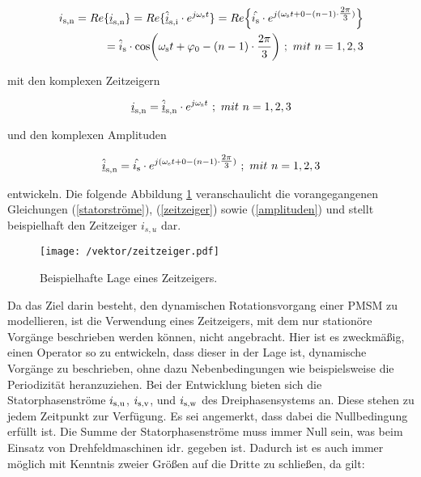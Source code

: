 \begin{align}
	\begin{split}
    i_\i{s,n} = Re\{\underline{i}_\i{s,n}\} = Re\{\underline{\hat i}_\i{s,i}\cdot e^{j\omega_\i{s}t}\} = Re\Bigl\{\hat{i_\i{s}}\cdot e^{j(\omega_\i{s}t+0-(n-1)\cdot\tfrac{2\pi}{3})}\Bigr\}
	\\=\hat{i}_\i{s}\cdot\si{cos}\bigg(\omega_\i{s}t+\varphi_\i{0}-(n-1)\cdot\frac{2\pi}{3}\bigg)~;~mit~n=1,2,3 \label{statorströme} 
\end{split}
\end{align}

mit den komplexen Zeitzeigern

\begin{align}
	\underline{i}_\i{s,n} = \underline{\hat i}_\i{s,n}\cdot e^{j\omega_\i{s}t}~;~mit~n=1,2,3 \label{zeitzeiger}
\end{align}

und den komplexen Amplituden

\begin{align}
	\underline{\hat i}_\i{s,n} = \hat{i_\i{s}}\cdot e^{j(\omega_\i{s}t+0-(n-1)\cdot\tfrac{2\pi}{3})}~;~mit~n=1,2,3 \label{amplituden}
\end{align}

entwickeln. 
Die folgende Abbildung \ref{fig:zeitzeiger} veranschaulicht die vorangegangenen Gleichungen (\ref{statorströme}), (\ref{zeitzeiger}) sowie (\ref{amplituden}) und stellt beispielhaft den Zeitzeiger $i_{s,u}$ dar.

\begin{figure}[h]
	\centering
	\texttt{[image: /vektor/zeitzeiger.pdf]}
	\label{fig:zeitzeiger}
	\caption{Beispielhafte Lage eines Zeitzeigers.}
\end{figure}

Da das Ziel darin besteht, den dynamischen Rotationsvorgang einer PMSM zu modellieren, ist die Verwendung eines Zeitzeigers, mit dem nur stationöre Vorgänge beschrieben werden können, nicht angebracht. 
Hier ist es zweckmäßig, einen Operator so zu entwickeln, dass dieser in der Lage ist, dynamische Vorgänge zu beschrieben, ohne dazu Nebenbedingungen wie beispielsweise die Periodizität heranzuziehen. 
Bei der Entwicklung bieten sich die Statorphasenströme $i_\i{s,u}$, $i_\i{s,v}$, und $i_\i{s,w}$ des Dreiphasensystems an.
Diese stehen zu jedem Zeitpunkt zur Verfügung. 
Es sei angemerkt, dass dabei die Nullbedingung erfüllt ist. 
Die Summe der Statorphasenströme muss immer Null sein, was beim Einsatz von Drehfeldmaschinen idr. gegeben ist.
Dadurch ist es auch immer möglich mit Kenntnis zweier Größen auf die Dritte zu schließen, da gilt:


